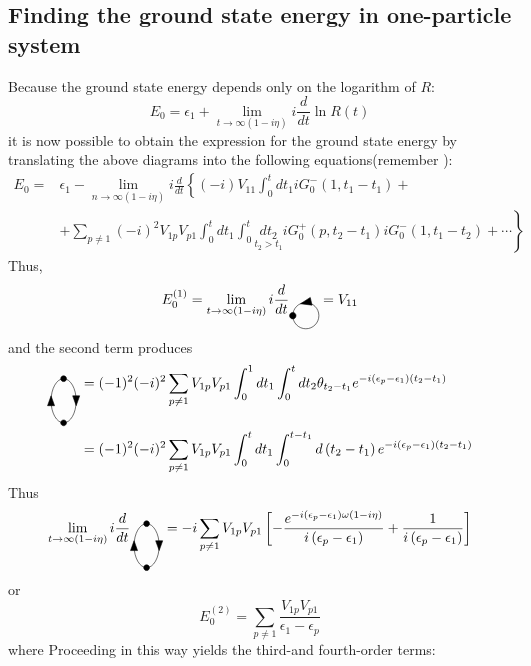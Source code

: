 \subsection{Finding the ground state energy in one-particle system}
Because the ground state energy depends only on the logarithm of $R$:
$$
E_{0}=\epsilon_{1}+\lim _{t \rightarrow \infty(1-i \eta)} i \frac{d}{d t} \ln R(t)
$$
it is now possible to obtain the expression for the ground state energy by translating the above diagrams into the following equations(remember ):
\begin{equation}
    \begin{aligned}
    E_{0}=&\epsilon_{1}-\lim _{n \rightarrow \infty(1-i\eta )} i \frac{d}{d t}\left\{(-i) V_{11} \int_{0}^{t} d t_{1} i G_{0}^{-}\left(1, t_{1}-t_{1}\right)+\right.\\
    &\left.+\sum_{p \neq 1}(-i)^{2} V_{1 p} V_{p 1} \int_{0}^{t} d t_{1} \int_{0}^{t} \underset{t_2>t_1}{d t_{2}} i G_{0}^{+}\left(p, t_{2}-t_{1}\right) i G_{0}^{-}\left(1, t_{1}-t_{2}\right)+\cdots\right\}
    \end{aligned}
\end{equation}
Thus, 
$$
E_0^{(1)}=\lim_{t\rightarrow\infty(1-i\eta)}i\frac{d}{dt}\selfcirc=V_{11}
$$
and the second term produces
$$
\begin{aligned}
\fermiloop&=(-1)^{2}(-i)^{2} \sum_{p \neq 1} V_{1 p} V_{p 1} \int_{0}^{1} d t_{1} \int_{0}^{t} d t_{2} \theta_{t_2-t_1} e^{-i\left(\epsilon_{p}-\epsilon_{1}\right)\left(t_{2}-t_{1}\right)}\\
&=(-1)^{2}(-i)^{2} \sum_{p \neq 1} V_{1 p} V_{p 1} \int_{0}^{t} d t_{1} \int_{0}^{t-t_{1}} d\left(t_{2}-t_{1}\right) e^{-i\left(\epsilon_{p}-\epsilon_1\right)\left(t_{2}-t_{1}\right)}
\end{aligned}
$$
Thus
$$
\lim _{t \rightarrow \infty(1-i\eta)} i \frac{d}{d t}\fermiloop=-i \sum_{p \neq 1} V_{1 p} V_{p 1}\left[-\frac{e^{-i\left(\epsilon_{p}-\epsilon_{1}\right) \omega(1-i \eta)}}{i\left(\epsilon_{p}-\epsilon_{1}\right)}+\frac{1}{i\left(\epsilon_{p}-\epsilon_{1}\right)}\right]
$$
or
\begin{equation}E_{0}^{(2)}=\sum_{p \neq 1} \frac{V_{1 p} V_{p 1}}{\epsilon_{1}-\epsilon_{p}}\end{equation}
where  Proceeding in this way yields the third-and fourth-order terms:
